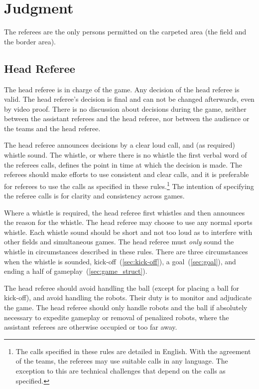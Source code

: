 \section{Judgment}
\label{sec:judgment}

The referees are the only persons permitted on the carpeted area (\ie the field and the border area).

\subsection{Head Referee}
\label{sec:head_referee}

The head referee is in charge of the game.
Any decision of the head referee is valid.
The head referee's decision is final and can not be changed afterwards, even by video proof.
There is no discussion about decisions during the game, neither between the assistant referees and the head referee, nor between the audience or the teams and the head referee.

The head referee announces decisions by a clear loud call, and (as required) whistle sound.
The whistle, or where there is no whistle the first verbal word of the referees calls, defines the point in time at which the decision is made.
The referees should make efforts to use consistent and clear calls, and it is preferable for referees to use the calls as specified in these rules.\footnote{
  The calls specified in these rules are detailed in English.
  With the agreement of the teams, the referees may use suitable calls in any language.
  The exception to this are technical challenges that depend on the calls as specified.
}
The intention of specifying the referee calls is for clarity and consistency across games.

Where a whistle is required, the head referee first whistles and then announces the reason for the whistle.
The head referee may choose to use any normal sports whistle.
Each whistle sound should be short and not too loud as to interfere with other fields and simultaneous games.
The head referee must \textit{only} sound the whistle in circumstances described in these rules.
There are three circumstances when the whistle is sounded, kick-off~(\cf \cref{sec:kick-off}), a goal~(\cf \cref{sec:goal}), and ending a half of gameplay~(\cf \cref{sec:game_struct}).

The head referee should avoid handling the ball (except for placing a ball for kick-off), and avoid handling the robots.
Their duty is to monitor and adjudicate the game.
The head referee should only handle robots and the ball if absolutely necessary to expedite gameplay or removal of penalized robots, where the assistant referees are otherwise occupied or too far away.

